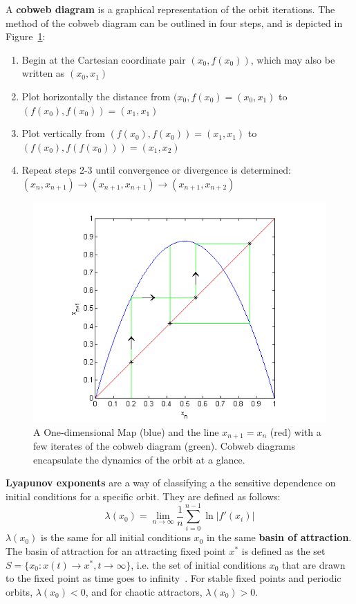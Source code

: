 A \textbf{cobweb diagram} is a graphical representation of the orbit
iterations. The method of the cobweb diagram can be outlined in four
steps, and is depicted in Figure~\ref{fig:cobex}:
\begin{enumerate}
\item Begin at the Cartesian coordinate pair $(x_0, f(x_0))$, which
  may also be written as $(x_0, x_1)$
\item Plot horizontally the distance from $(x_0, f(x_0)=(x_0, x_1)$ to $(f(x_0),
  f(x_0))=(x_1, x_1)$
\item Plot vertically from $(f(x_0), f(x_0))=(x_1, x_1)$ to $(f(x_0), f(f(x_0)))=(x_1, x_2)$
\item Repeat steps 2-3 until convergence or divergence is determined:
  $(x_n, x_{n+1}) \to (x_{n+1}, x_{n+1}) \to (x_{n+1},x_{n+2})$
\end{enumerate}
\begin{figure}[!h]
\caption[Example of a Cobweb Diagram]{A One-dimensional Map (blue) and
  the line $x_{n+1}=x_n$ (red) with a few iterates of the cobweb
  diagram (green). Cobweb diagrams encapsulate the dynamics of the orbit at a glance.}\label{fig:cobex}
    \begin{center}
	\includegraphics[scale=0.8]{figs/cobweb_ex.png}
    \end{center}
\end{figure}

\textbf{Lyapunov exponents} are a way of classifying a the sensitive
dependence on initial conditions for a specific orbit. They are defined as follows:
\begin{equation}
\lambda(x_0) = \lim_{n \to \infty} \frac{1}{n} \sum_{i=0}^{n-1} \ln |f'(x_i)|
\end{equation}
$\lambda(x_0)$ is the same for all initial conditions $x_0$ in the same \textbf{basin of
attraction}. The basin of attraction for an attracting fixed point
$x^*$ is defined as the set $S=\{x_0:x(t) \to x^*, t \to \infty\}$, i.e.
the set of initial conditions $x_0$ that are drawn to the fixed point
as time goes to infinity~\cite{strogatz}. For stable fixed points and periodic orbits, $\lambda(x_0) < 0$,
and for chaotic attractors, $\lambda(x_0)>0$.

